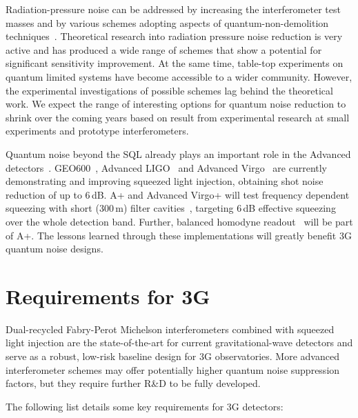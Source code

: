 Radiation-pressure noise can be addressed by increasing the interferometer test masses and by various schemes adopting aspects of quantum-non-demolition techniques~\cite{KLMTV2001,PuCh2002,Che2003,Braginsky:2004fp}. Theoretical research into radiation pressure noise reduction is very active and has produced a wide range of schemes that show a potential for significant sensitivity improvement. At the same time, table-top experiments on quantum limited systems have become accessible to a wider community. However, the experimental investigations of possible schemes lag behind the theoretical work. We expect the range of interesting options for quantum noise reduction to shrink over the coming years based on result from experimental research at small experiments and prototype interferometers.

Quantum noise beyond the SQL already plays an important role in the Advanced detectors~\cite{BuCh2001}. GEO600~\cite{GEO:Squeezing}, Advanced LIGO~\cite{H1:Squeezing,AdvancedLIGO2015} and Advanced Virgo~\cite{AdvancedVirgo2015} are currently demonstrating and improving squeezed light injection, obtaining shot noise reduction of up to 6\,dB. A+ and Advanced Virgo+ will test frequency dependent squeezing with short (300\,m) filter cavities~\cite{Eva2013,TAMA_FDS2016}, targeting 6\,dB effective squeezing over the whole detection band. Further, balanced homodyne readout~\cite{BHD,Stefszky:Balanced2012} will be part of A+. The lessons learned through these implementations will greatly benefit 3G quantum noise designs.

\section{Requirements for 3G}
Dual-recycled Fabry-Perot Michelson interferometers combined with squeezed light injection are the state-of-the-art for current gravitational-wave detectors and serve as a robust, low-risk baseline design for 3G observatories. More advanced interferometer schemes
may offer potentially higher quantum noise suppression factors, but they require further R\&D to be fully developed. 

The following list details some key requirements for 3G detectors:

